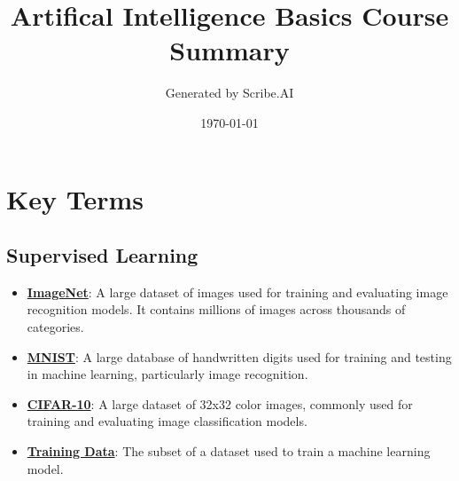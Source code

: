 \documentclass{article}%
\title{Artifical Intelligence Basics Course Summary}%
\author{Generated by Scribe.AI}%
\date{\today}%
\begin{document}
%
\normalsize%
\maketitle%
\section{Key Terms}%
\label{sec:KeyTerms}%
\subsection{Supervised Learning}%
\label{subsec:SupervisedLearning}%
\begin{itemize}[leftmargin=*]%
\item \href{https://purdue.brightspace.com/d2l/common/assets/pdfjs-d2l-dist/1.0.14-legacy/web/viewer.html?file=\%2Fcontent\%2Fenforced\%2F1095467-wl.202510.CS.24300.001\%2F09L1-cnn.pdf\%3Fou\%3D1095467\&lang=en-us\&container=d2l-fileviewer-rendered-pdf\&fullscreen=d2l-fileviewer-rendered-pdf-dialog\&height=667#page=3}{\textbf{ImageNet}}: A large dataset of images used for training and evaluating image recognition models. It contains millions of images across thousands of categories.%
\item \href{https://purdue.brightspace.com/d2l/common/assets/pdfjs-d2l-dist/1.0.14-legacy/web/viewer.html?file=\%2Fcontent\%2Fenforced\%2F1095467-wl.202510.CS.24300.001\%2F09L1-cnn.pdf\%3Fou\%3D1095467\&lang=en-us\&container=d2l-fileviewer-rendered-pdf\&fullscreen=d2l-fileviewer-rendered-pdf-dialog\&height=667#page=21}{\textbf{MNIST}}: A large database of handwritten digits used for training and testing in machine learning, particularly image recognition.%
\item \href{https://purdue.brightspace.com/d2l/common/assets/pdfjs-d2l-dist/1.0.14-legacy/web/viewer.html?file=\%2Fcontent\%2Fenforced\%2F1095467-wl.202510.CS.24300.001\%2F09L1-cnn.pdf\%3Fou\%3D1095467\&lang=en-us\&container=d2l-fileviewer-rendered-pdf\&fullscreen=d2l-fileviewer-rendered-pdf-dialog\&height=667#page=23}{\textbf{CIFAR-10}}: A large dataset of 32x32 color images, commonly used for training and evaluating image classification models.%
\item \href{https://purdue.brightspace.com/d2l/common/assets/pdfjs-d2l-dist/1.0.14-legacy/web/viewer.html?file=\%2Fcontent\%2Fenforced\%2F1095467-wl.202510.CS.24300.001\%2F10L1-CrossValidation.pdf\%3Fou\%3D1095467\&lang=en-us\&container=d2l-fileviewer-rendered-pdf\&fullscreen=d2l-fileviewer-rendered-pdf-dialog\&height=667#page=6}{\textbf{Training Data}}: The subset of a dataset used to train a machine learning model.%

\end{itemize}
\end{document}
